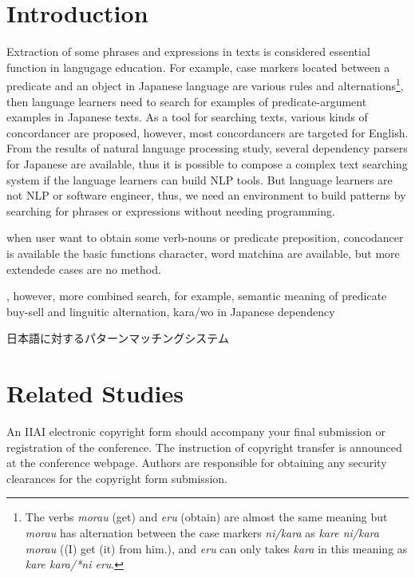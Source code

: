 \documentclass[11pt, onecolumn, twoside, a4paper]{article}
\begin{document}
\section{Introduction}
Extraction of some phrases and expressions in texts is considered essential function in langugage education.
For example, case markers located between a predicate and an object in Japanese language are various
rules and alternations\footnote{The verbs {\it morau} (get) and {\it eru} (obtain) are almost the same meaning
but {\it morau} has alternation between the case markers {\it ni/kara} as {\it kare ni/kara morau}
((I) get (it) from him.), and 
{\it eru} can only takes {\it kara} in this meaning as {\it kare kara/*ni eru}.},
then language learners need to search for examples of predicate-argument
examples in Japanese texts. 
As a tool for searching texts, various kinds of concordancer are proposed, however, most concordancers
are targeted for English. From the results of natural language processing study, several dependency parsers for
Japanese are available, thus it is possible to compose a complex text searching system if
the language learners can build NLP tools. But language learners are not NLP or software engineer,
thus, we need an environment to build patterns by searching for phrases or expressions without
needing programming.


when user want to obtain some verb-nouns or predicate preposition,
concodancer is available the basic functions character, word matchina are available,
but more extendede cases are no method. 

, however, more combined search, for example, semantic meaning
of predicate buy-sell and linguitic alternation, kara/wo in Japanese
dependency 






日本語に対するパターンマッチングシステム



\section{Related Studies}
An IIAI electronic copyright form should accompany your final submission or registration of the conference. The instruction of copyright transfer is announced at the conference webpage. Authors are responsible for obtaining any security clearances for the copyright form submission.
\end{document}
